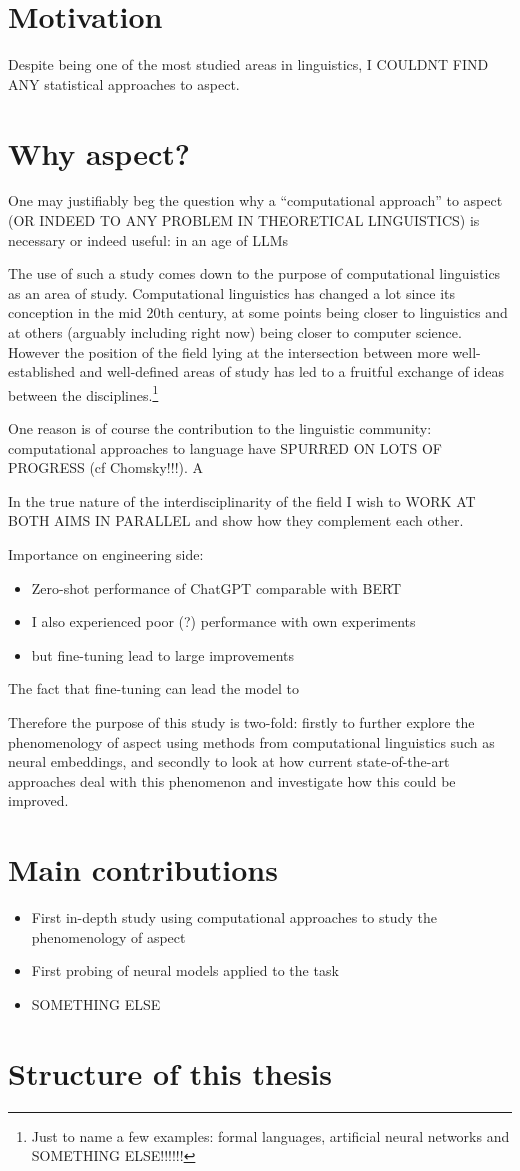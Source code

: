 \section*{Motivation}
Despite being one of the most studied areas in linguistics, I COULDNT FIND ANY statistical approaches to aspect. 
\section*{Why aspect?}
One may justifiably beg the question why a “computational approach” to aspect (OR INDEED TO ANY PROBLEM IN THEORETICAL LINGUISTICS) is necessary or indeed useful: in an age of LLMs

The use of such a study comes down to the purpose of computational linguistics as an area of study. Computational linguistics has changed a lot since its conception in the mid 20th century, at some points being closer to linguistics and at others (arguably including right now) being closer to computer science. However the position of the field lying at the intersection between more well-established and well-defined areas of study has led to a fruitful exchange of ideas between the disciplines.\footnote{Just to name a few examples: formal languages, artificial neural networks and SOMETHING ELSE!!!!!!}

One reason is of course the contribution to the linguistic community: computational approaches to language have SPURRED ON LOTS OF PROGRESS (cf Chomsky!!!). A 

In the true nature of the interdisciplinarity of the field I wish to WORK AT BOTH AIMS IN PARALLEL and show how they complement each other.

Importance on engineering side:
\begin{itemize}
    \item{Zero-shot performance of ChatGPT comparable with BERT \citep{zhong2023chatgpt}}
    \item{I also experienced poor (?) performance with own experiments}
    \item{but fine-tuning lead to large improvements}
\end{itemize}

The fact that fine-tuning can lead the model to 

Therefore the purpose of this study is two-fold: firstly to further explore the phenomenology of aspect using methods from computational linguistics such as neural embeddings, and secondly to look at how current state-of-the-art approaches deal with this phenomenon and investigate how this could be improved.

\section*{Main contributions}
\begin{itemize}
    \item First in-depth study using computational approaches to study the phenomenology of aspect 
    \item First probing of neural models applied to the task
    \item SOMETHING ELSE
\end{itemize}
\section*{Structure of this thesis}